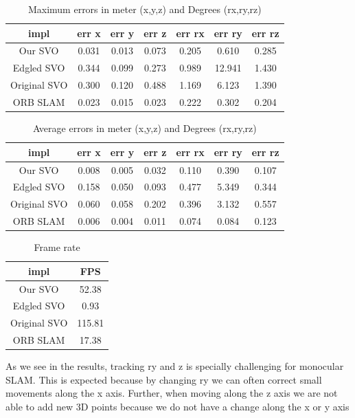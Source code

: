 \documentclass[11pt,a4paper,titlepage,oneside]{report}
\begin{document}
\begin{table}[H]
  \centering
  \begin{tabular}{|c|c|c|c|c|c|c|}
    impl & err x & err y & err z & err rx & err ry & err rz\\
    \hline
    Our SVO & 0.031 & 0.013 & 0.073 & 0.205 & 0.610 & 0.285\\
    Edgled SVO & 0.344 & 0.099 & 0.273 & 0.989 & 12.941 & 1.430\\
    Original SVO & 0.300 & 0.120 & 0.488 & 1.169 & 6.123 & 1.390\\
    ORB SLAM& 0.023 & 0.015 & 0.023 & 0.222 & 0.302 & 0.204
  \end{tabular}
  \caption{Maximum errors in meter (x,y,z) and Degrees (rx,ry,rz)}
  \label{tab:maximas}
\end{table}

\begin{table}[H]
  \centering
  \begin{tabular}{|c|c|c|c|c|c|c|}
  impl & err x & err y & err z & err rx & err ry & err rz\\
  \hline
  Our SVO & 0.008 & 0.005 & 0.032 & 0.110 & 0.390 & 0.107\\
  Edgled SVO & 0.158 & 0.050 & 0.093 & 0.477 & 5.349 & 0.344\\
  Original SVO & 0.060 & 0.058 & 0.202 & 0.396 & 3.132 & 0.557\\
  ORB SLAM & 0.006 & 0.004 & 0.011 & 0.074 & 0.084 & 0.123
\end{tabular}

\caption{Average errors in meter (x,y,z) and Degrees (rx,ry,rz)}
\label{tab:average}
\end{table}

\begin{table}[H]
  \centering
  \begin{tabular}{|c|c|}
  impl & FPS\\
  \hline
  Our SVO & 52.38\\
  Edgled SVO & 0.93\\
  Original SVO & 115.81\\
  ORB SLAM & 17.38
\end{tabular}
\caption{Frame rate}
\label{tab:fps}
\end{table}

As we see in the results, tracking ry and z is specially challenging for monocular SLAM. This is expected because by changing ry we can often correct small movements along the x axis. Further, when moving along the z axis we are not able to add new 3D points because we do not have a change along the x or y axis
\end{document}
